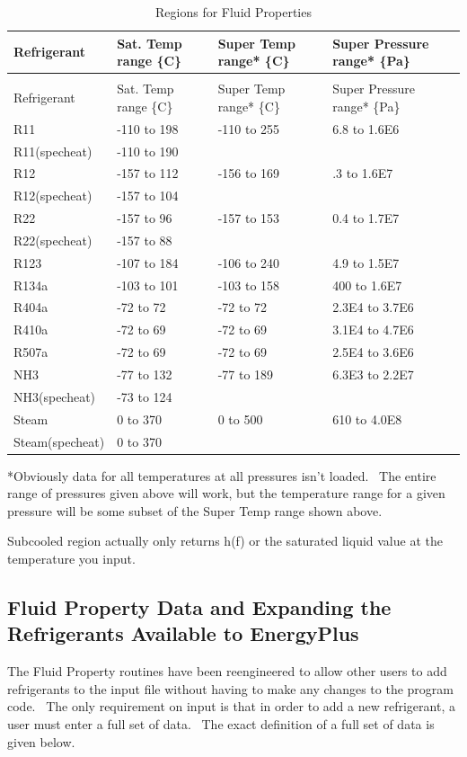 \begin{longtable}[c]{p{1.5in}p{1.5in}p{1.5in}p{1.5in}}
\caption{Regions for Fluid Properties \label{table:regions-for-fluid-properties}} \tabularnewline
\toprule
Refrigerant & Sat. Temp range \{C\} & Super Temp range* \{C\} & Super Pressure range* \{Pa\} \tabularnewline
\midrule
\endfirsthead

\caption[]{Regions for Fluid Properties} \tabularnewline
\toprule
Refrigerant & Sat. Temp range \{C\} & Super Temp range* \{C\} & Super Pressure range* \{Pa\} \tabularnewline
\midrule
\endhead

R11 & -110 to 198 & -110 to 255 & 6.8 to 1.6E6 \tabularnewline
R11(specheat) & -110 to 190 & ~ & ~ \tabularnewline
R12 & -157 to 112 & -156 to 169 & .3 to 1.6E7 \tabularnewline
R12(specheat) & -157 to 104 & ~ & ~ \tabularnewline
R22 & -157 to 96 & -157 to 153 & 0.4 to 1.7E7 \tabularnewline
R22(specheat) & -157 to 88 & ~ & ~ \tabularnewline
R123 & -107 to 184 & -106 to 240 & 4.9 to 1.5E7 \tabularnewline
R134a & -103 to 101 & -103 to 158 & 400 to 1.6E7 \tabularnewline
R404a & -72 to 72 & -72 to 72 & 2.3E4 to 3.7E6 \tabularnewline
R410a & -72 to 69 & -72 to 69 & 3.1E4 to 4.7E6 \tabularnewline
R507a & -72 to 69 & -72 to 69 & 2.5E4 to 3.6E6 \tabularnewline
NH3 & -77 to 132 & -77 to 189 & 6.3E3 to 2.2E7 \tabularnewline
NH3(specheat) & -73 to 124 & ~ & ~ \tabularnewline
Steam & 0 to 370 & 0 to 500 & 610 to 4.0E8 \tabularnewline
Steam(specheat) & 0 to 370 & ~ & ~ \tabularnewline
\bottomrule
\end{longtable}

*Obviously data for all temperatures at all pressures isn't loaded.~ The entire range of pressures given above will work, but the temperature range for a given pressure will be some subset of the Super Temp range shown above.

Subcooled region actually only returns h(f) or the saturated liquid value at the temperature you input.

\subsection{Fluid Property Data and Expanding the Refrigerants Available to EnergyPlus}\label{fluid-property-data-and-expanding-the-refrigerants-available-to-energyplus}

The Fluid Property routines have been reengineered to allow other users to add refrigerants to the input file without having to make any changes to the program code.~ The only requirement on input is that in order to add a new refrigerant, a user must enter a full set of data.~ The exact definition of a full set of data is given below.

